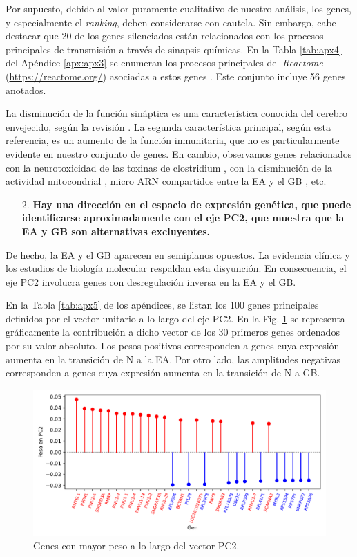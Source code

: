 Por supuesto, debido al valor puramente cualitativo de nuestro análisis, los genes, y especialmente el \textit{ranking}, deben considerarse con cautela. Sin embargo, cabe destacar que 20 de los genes silenciados están relacionados con los procesos principales de transmisión a través de sinapsis químicas. En la Tabla \ref{tab:apx4} del Apéndice \ref{apx:apx3} se enumeran los procesos principales del \textit{Reactome} (\href{https://reactome.org/}{https://reactome.org/}) asociadas a estos genes \cite{Gillespie_2021}. Este conjunto incluye 56 genes anotados.

La disminución de la función sináptica es una característica conocida del cerebro envejecido, según la revisión \cite{Ham_2020}. La segunda característica principal, según esta referencia, es un aumento de la función inmunitaria, que no es particularmente evidente en nuestro conjunto de genes. En cambio, observamos genes relacionados con la neurotoxicidad de las toxinas de clostridium \cite{Biazzo_2022}, con la disminución de la actividad mitocondrial \cite{Sun_2016}, micro ARN compartidos entre la EA y el GB \cite{Thomas_2020}, etc.

\begin{enumerate}
	\item[2.] \textbf{Hay una dirección en el espacio de expresión genética, que puede identificarse aproximadamente con el eje PC2, que muestra que la EA y GB son alternativas excluyentes.}
\end{enumerate}

De hecho, la EA y el GB aparecen en semiplanos opuestos. La evidencia clínica \cite{ou2012does, Driver_2012, Roe_2010, Musicco_2013} y los estudios de biología molecular \cite{Liu_2013, Lanni_2020} respaldan esta disyunción. En consecuencia, el eje PC2 involucra genes con desregulación inversa en la EA y el GB.

En la Tabla \ref{tab:apx5} de los apéndices, se listan los 100 genes principales definidos por el vector unitario a lo largo del eje PC2. En la Fig. \ref{fig:figpc2} se representa gráficamente la contribución a dicho vector de los 30 primeros genes ordenados por su valor absoluto. Los pesos positivos corresponden a genes cuya expresión aumenta en la transición de N a la EA. Por otro lado, las amplitudes negativas corresponden a genes cuya expresión aumenta en la transición de N a GB.

\begin{figure}[!htb]
	\centering
	\includegraphics[width=\linewidth]{figures/PC2}
	\caption{Genes con mayor peso a lo largo del vector PC2.}
	\label{fig:figpc2}
\end{figure}


